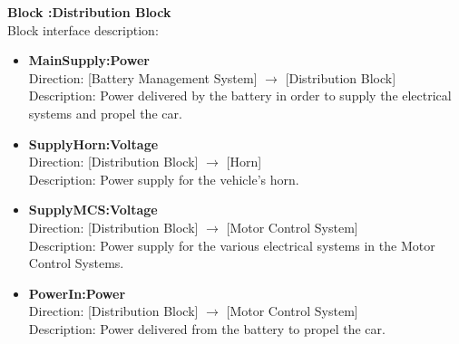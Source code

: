 \textbf{Block :Distribution Block}\\
Block interface description:
\begin{itemize}
	\item \textbf{MainSupply:Power}\\
	Direction: [Battery Management System] $\rightarrow$ [Distribution Block]\\
	Description: Power delivered by the battery in order to supply the electrical systems and propel the car.
	\item \textbf{SupplyHorn:Voltage}\\
	Direction: [Distribution Block] $\rightarrow$ [Horn]\\
	Description: Power supply for the vehicle's horn.
	\item \textbf{SupplyMCS:Voltage}\\
	Direction: [Distribution Block] $\rightarrow$ [Motor Control System]\\
	Description: Power supply for the various electrical systems in the Motor Control Systems.
	\item \textbf{PowerIn:Power}\\
	Direction: [Distribution Block] $\rightarrow$ [Motor Control System]\\
	Description: Power delivered from the battery to propel the car.
\end{itemize}

